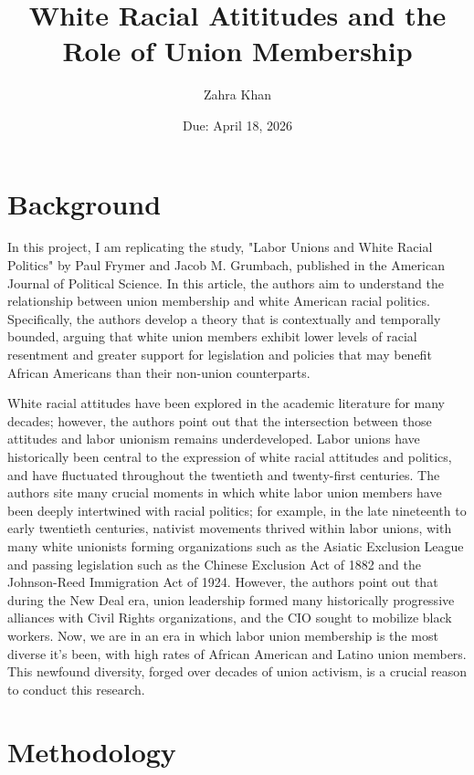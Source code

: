 \documentclass[12pt,letterpaper]{article}
\title{White Racial Atititudes and the Role of Union Membership}
\date{Due: April 18, 2026}
\author{Zahra Khan}
\begin{document}
	\maketitle
	\section*{Background}
	In this project, I am replicating the study, "Labor Unions and White Racial Politics" by Paul Frymer and Jacob M. Grumbach, published in the American Journal of Political Science. 
	In this article, the authors aim to understand the relationship between union membership and white American racial politics. Specifically, the authors develop a theory that is contextually and temporally bounded, arguing that white union members exhibit lower levels of racial resentment and greater support for legislation and policies that may benefit African Americans than their non-union counterparts. 
	
	White racial attitudes have been explored in the academic literature for many decades; however, the authors point out that the intersection between those attitudes and labor unionism remains underdeveloped. Labor unions have historically been central to the expression of white racial attitudes and politics, and have fluctuated throughout the twentieth and twenty-first centuries. The authors site many crucial moments in which white labor union members have been deeply intertwined with racial politics; for example, in the late nineteenth to early twentieth centuries, nativist movements thrived within labor unions, with many white unionists forming organizations such as the Asiatic Exclusion League and passing legislation such as the Chinese Exclusion Act of 1882 and the Johnson-Reed Immigration Act of 1924. However, the authors point out that during the New Deal era, union leadership formed many historically progressive alliances with Civil Rights organizations, and the CIO sought to mobilize black workers. Now, we are in an era in which labor union membership is the most diverse it's been, with high rates of African American and Latino union members. This newfound diversity, forged over decades of union activism, is a crucial reason to conduct this research. 

	
	\maketitle
	\section*{Methodology}
	
\end{document}
